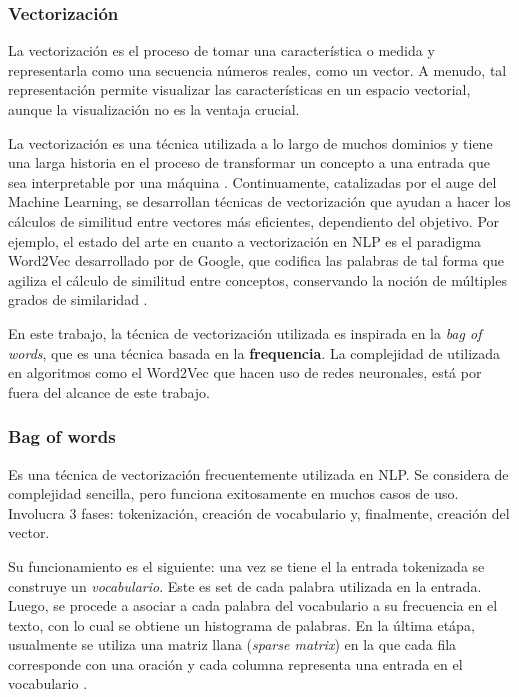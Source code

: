 \documentclass[12pt,letterpaper,twoside]{article}
\begin{document}
\subsubsection{Vectorización}
\label{sec:orgc50c8a3}
La vectorización es el proceso de tomar una característica o medida
y representarla como una secuencia números reales, como un vector. A menudo,
tal representación permite visualizar las características en un espacio
vectorial, aunque la visualización no es la ventaja crucial.

La vectorización es una técnica utilizada a lo largo de muchos
dominios y tiene una larga historia en el proceso de transformar
un concepto a una entrada que sea interpretable por una máquina
\cite{jha_abhishek_vectorization}.  Continuamente, catalizadas
por el auge del Machine Learning, se desarrollan técnicas de
vectorización que ayudan a hacer los cálculos de similitud entre
vectores más eficientes, dependiento del objetivo. Por ejemplo,
el estado del arte en cuanto a vectorización en NLP es el
paradigma Word2Vec desarrollado por de Google, que codifica las
palabras de tal forma que agiliza el cálculo de similitud entre
conceptos, conservando la noción de múltiples grados de
similaridad \cite{mikolov2013efficient}.

En este trabajo, la técnica de vectorización utilizada es
inspirada en la \emph{bag of words}, que es una técnica basada en la
\textbf{frequencia}. La complejidad de utilizada en algoritmos como el
Word2Vec que hacen uso de redes neuronales, está por fuera del alcance
de este trabajo.

\subsubsection{Bag of words}
\label{sec:org67ce252}

Es una técnica de vectorización frecuentemente utilizada en NLP.
Se considera de complejidad sencilla, pero funciona exitosamente
en muchos casos de uso. Involucra 3 fases: tokenización, creación de vocabulario y,
finalmente, creación del vector.

Su funcionamiento es el siguiente: una vez se tiene el la entrada
tokenizada se construye un \emph{vocabulario}.  Este es set de cada
palabra utilizada en la entrada.  Luego, se procede a asociar a
cada palabra del vocabulario a su frecuencia en el texto, con lo
cual se obtiene un histograma de palabras. En la última etápa,
usualmente se utiliza una matriz llana (\emph{sparse matrix}) en la
que cada fila corresponde con una oración y cada columna
representa una entrada en el vocabulario
\cite{jha_abhishek_vectorization}.
\end{document}
